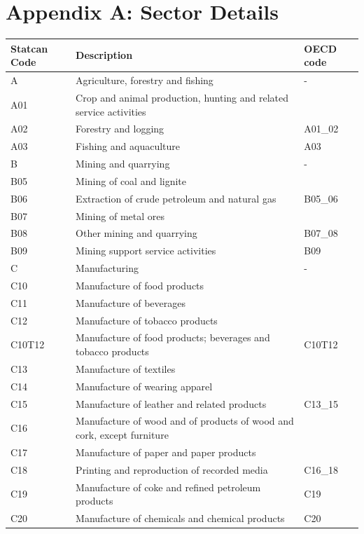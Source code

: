\documentclass[12pt]{article}
\begin{document}
\section{Appendix A: Sector Details}


\small
{}
\begin{tabularx}{\textwidth}{l X l}
\hline
\textbf{Statcan Code} & \textbf{Description} & \textbf{OECD code} \\
\hline
\hline
A       & Agriculture, forestry and fishing &  - \\
A01     & Crop and animal production, hunting and related service activities &  \\
A02     & Forestry and logging & A01\_02  \\
A03     & Fishing and aquaculture & A03  \\
B       & Mining and quarrying & -   \\
B05     & Mining of coal and lignite &   \\
B06     & Extraction of crude petroleum and natural gas & B05\_06  \\
B07     & Mining of metal ores &  \\
B08     & Other mining and quarrying & B07\_08  \\
B09     & Mining support service activities & B09  \\
C       & Manufacturing &  - \\
C10     & Manufacture of food products &   \\
C11     & Manufacture of beverages &  \\
C12     & Manufacture of tobacco products &  \\
C10T12  & Manufacture of food products; beverages and tobacco products & C10T12  \\
C13     & Manufacture of textiles &  \\
C14     & Manufacture of wearing apparel &  \\
C15     & Manufacture of leather and related products & C13\_15  \\
C16     & Manufacture of wood and of products of wood and cork, except furniture &   \\
C17     & Manufacture of paper and paper products &  \\
C18     & Printing and reproduction of recorded media & C16\_18  \\
C19     & Manufacture of coke and refined petroleum products & C19 \\
C20     & Manufacture of chemicals and chemical products & C20 \\

\end{tabularx}
\end{document}
